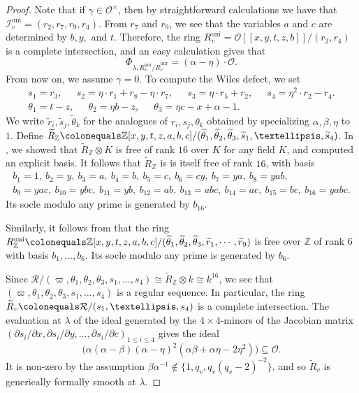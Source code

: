 \documentclass[a4paper, notitlepage, 10pt]{amsart}
\theoremstyle{plain} %
\theoremstyle{definition} %
\theoremstyle{remark} %
\numberwithin{equation}{section}
\newcommand{\bbZ}{\mathbb Z}
\newcommand{\uni}{\operatorname{uni}}
\newcommand{\unr}{\operatorname{unr}}
\begin{document}
\begin{proof}
    Note that if $\gamma\in \mathcal{O}^\times$, then by straightforward calculations we have that  $\mathcal{I}_v^{\uni}=(r_2,r_7,r_9,r_4)$. From $r_7$ and $r_9$, we see that the variables $a$ and $c$ are determined by $b,y,$ and $t$. Therefore, the ring $R^{\uni}_v=\mathcal{O}[[x,y,t,z,b]]/(r_2,r_4)$ is a complete intersection, and an easy calculation gives that
 \begin{equation*}
\Phi_{\lambda,R^{\uni}_v/\overline{R}^{\unr}_v}= (\alpha-\eta)\cdot\mathcal{O}.
 \end{equation*}
    From now on, we assume $\gamma=0$. To compute the Wiles defect, we set
    \begin{gather*}
        s_1=r_3, \  \quad \ s_2=\eta \cdot r_1+r_8-\eta\cdot r_7, \ \quad \ s_3=\eta\cdot r_5+r_2, \ \quad \ s_4=\eta^2\cdot r_2-r_4.
        \\ \theta_1=t-z,\ \quad \ \theta_2=\eta b-z, \ \quad \ \theta_3=\eta c-x+\alpha-1.
    \end{gather*}
    We write $\widetilde{r}_i,\widetilde{s}_j,\widetilde{\theta}_k$ for the analogues of $r_i,s_j,\theta_k$ obtained by specializing $\alpha,\beta,\eta$ to $1$. Define $\widetilde{R}_{\bbZ}\colonequals\bbZ[x,y,t,z,a,b,c]/(\widetilde{\theta}_1,\widetilde{\theta}_2,\widetilde{\theta}_3,\widetilde{s}_1,\dots,\widetilde{s}_4)$. In , we showed that $\widetilde{R}_{\bbZ}\otimes K$ 
    is free of rank $16$ over $K$ for any field $K$, and computed an explicit basis. It follows that $\widetilde{R}_{\bbZ}$ is is itself free of rank $16$, with basis 
    \begin{gather*}
               b_{1}= 1,\ b_{2}= y,\ b_{3} = a, \ b_{4}=b,\ b_{5}= c,\ b_{6}= cy,  \ b_7 = ya,\ b_8 = yab,
       \\ b_9= yac,\ b_{10}= ybc,\ b_{11}= yb,\ b_{12}= ab,\ b_{13}= abc,\ b_{14}= ac,\ b_{15}=  bc, \ b_{16}= yabc.
    \end{gather*}
    Its socle modulo any prime is generated by $b_{16}$.
    
    Similarly, it follows from  that the ring $R^{\uni}_{\bbZ}\colonequals\bbZ[x,y,t,z,a,b,c]/(\widetilde{\theta}_1,\widetilde{\theta}_2,\widetilde{\theta}_3,\widetilde{r}_1,\cdots,\widetilde{r}_9)$ is free over $\mathbb{Z}$ of rank $6$ with basis $b_1,\dots,b_6$. Its socle modulo any prime is generated by $b_6$.
    
    Since $\mathcal{R}/(\varpi,\theta_1,\theta_2,\theta_3,s_1,\dots,s_4)\cong \widetilde{R}_{\bbZ}\otimes k\cong k^{16}$, we see that $(\varpi,\theta_1,\theta_2,\theta_3,s_1,\dots,s_4)$ is a regular sequence. In particular, the ring $\widetilde{R}_v\colonequals \mathcal{R}/(s_1,\dots,s_4)$ is a complete intersection. The evaluation at $\lambda$ of the ideal generated by the $4\times 4$-minors of the Jacobian matrix $(\partial s_i/\partial x, \partial s_i/\partial y,\dots,\partial s_i/\partial c)_{1\le i \le 4}$ gives the ideal
    $$ \big(\alpha(\alpha-\beta)(\alpha-\eta)^2(\alpha\beta+\alpha\eta-2\eta^2)\big)\subseteq \mathcal{O}. $$
    It is non-zero by the assumption $\beta\alpha^{-1}\not\in \{1,q_v,q_v(q_v-2)^{-2}\}$, and so $\widetilde{R}_v$ is generically formally smooth at $\lambda$.


\end{proof}
\end{document}
